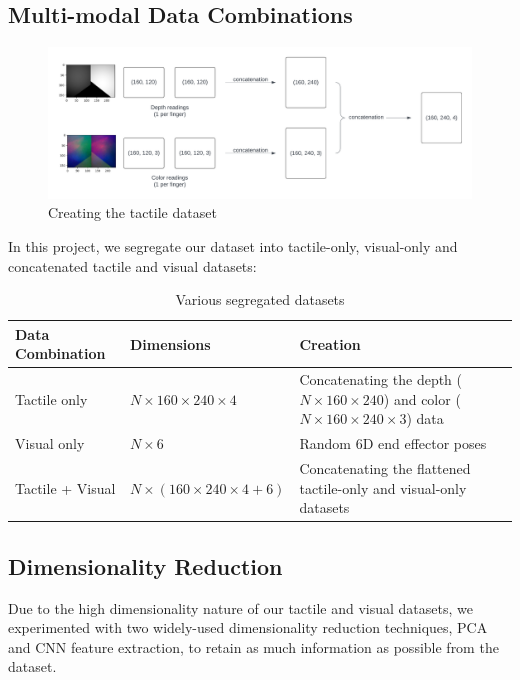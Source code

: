\documentclass[11pt, a4paper]{report}
\theoremstyle{definition}
\begin{document}
\subsection{Multi-modal Data Combinations}
\label{sec:4.4.1}
\begin{figure}[H]
    \centering
    \includegraphics[width=\textwidth]{docs/Project Report/Media/tactile_dataset_creation.png}
    \caption{Creating the tactile dataset}
    \label{fig:my_label}
\end{figure}
In this project, we segregate our dataset into tactile-only, visual-only and concatenated tactile and visual datasets:
\begin{table}[H]
    \centering
    \begin{tabular}{|p{3cm}|p{4cm}|p{6cm}|}
        \hline
        Data Combination & Dimensions & Creation \\
        \hline
        Tactile only & $N\times160\times240\times4$ & Concatenating the depth ($N\times160\times240$) and color ($N\times160\times240\times3$) data \\
        \hline
        Visual only & $N\times6$ & Random 6D end effector poses \\
        \hline
        Tactile + Visual & $N\times(160\times240\times4+6)$ & Concatenating the flattened tactile-only and visual-only datasets \\
        \hline
    \end{tabular}
    \caption{Various segregated datasets}
    \label{tbl:4.1}
\end{table}


\subsection{Dimensionality Reduction}
\label{sec:4.4.2}
Due to the high dimensionality nature of our tactile and visual datasets, we experimented with two widely-used dimensionality reduction techniques, PCA and CNN feature extraction, to retain as much information as possible from the dataset.
\end{document}

